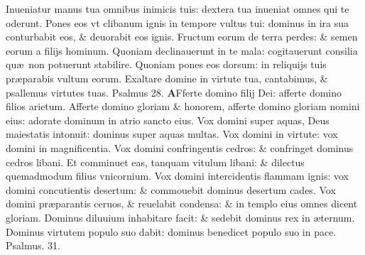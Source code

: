 \documentclass[a5paper,10pt]{book}
\def\ae{æ}
\begin{document}
\begin{multicols*}{2}
\newline \color{red} I\color{black}nueniatur manus tua omnibus inimicis tuis: dextera tua inueniat omnes qui te oderunt.
\newline \color{red} P\color{black}ones eos vt clibanum ignis in tempore vultus tui: dominus in ira sua conturbabit eos, \& deuorabit eos ignis.
\newline \color{red} F\color{black}ructum eorum de terra perdes: \& semen eorum a filijs hominum.
\newline \color{red} Q\color{black}uoniam declinauerunt in te mala: cogitauerunt consilia qu\ae \ non potuerunt stabilire.
\newline \color{red} Q\color{black}uoniam pones eos dorsum: in reliquijs tuis pr\ae parabis vultum eorum.
\newline \color{red} E\color{black}xaltare domine in virtute tua, cantabimus, \& psallemus virtutes tuas.
\newline \color{red} Psalmus 28. \color{black}
\vspace{-1em}
\lettrine[lines=2]{\bfseries \color{red} A}{}Fferte domino filij Dei: afferte domino filios arietum.
\newline \color{red} A\color{black}fferte domino gloriam \& honorem, afferte domino gloriam nomini eius: adorate dominum in atrio sancto eius.
\newline \color{red} V\color{black}ox domini super aquas, Deus maiestatis intonuit: dominus super aquas multas.
\newline \color{red} V\color{black}ox domini in virtute: vox domini in magnificentia.
\newline \color{red} V\color{black}ox domini confringentis cedros: \& confringet dominus cedros libani.
\newline \color{red} E\color{black}t comminuet eas, tanquam vitulum libani: \& dilectus quemadmodum filius vnicornium.
\newline \color{red} V\color{black}ox domini intercidentis flammam ignis: vox domini concutientis desertum: \& commouebit dominus desertum cades.
\newline \color{red} V\color{black}ox domini pr\ae parantis ceruos, \& reuelabit condensa: \& in templo eius omnes dicent gloriam.
\newline \color{red} D\color{black}ominus diluuium inhabitare facit: \& sedebit dominus rex in \ae ternum.
\newline \color{red} D\color{black}ominus virtutem populo suo dabit: dominus benedicet populo suo in pace.
\newline \color{red} Psalmus. 31. \color{black}

\end{multicols*}
\end{document}
